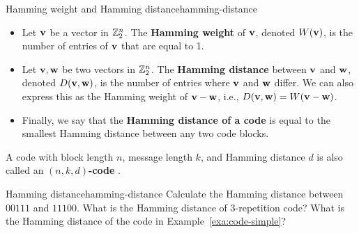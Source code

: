 \begin{definition}{Hamming weight and Hamming distance}{hamming-distance}
  \begin{itemize}
  \item Let $\mbox{\bf v}$ be a vector in $\mathbb{Z}_2^n$. The \textbf{Hamming
      weight}%
     of\/ $\mbox{\bf v}$,
    denoted $W(\mbox{\bf v})$, is the number of entries of\/ $\mbox{\bf v}$
    that are equal to 1.
  \item Let $\mbox{\bf v},\mbox{\bf w}$ be two vectors in $\mathbb{Z}_2^n$. The
    \textbf{Hamming distance}%
     between $\mbox{\bf v}$
    and $\mbox{\bf w}$, denoted $D(\mbox{\bf v},\mbox{\bf w})$, is the number of
    entries where $\mbox{\bf v}$ and $\mbox{\bf w}$ differ. We can also
    express this as the Hamming weight of\/ $\mbox{\bf v}-\mbox{\bf w}$, i.e.,
    $D(\mbox{\bf v},\mbox{\bf w})=W(\mbox{\bf v}-\mbox{\bf w})$.
  \item Finally, we say that the \textbf{Hamming distance of a code}
    is equal to the smallest Hamming distance between any two code
    blocks.
  \end{itemize}
  A code with block length $n$, message length $k$, and Hamming
  distance $d$ is also called an \textbf{$(n,k,d)$-code}%
  .
\end{definition}

\begin{example}{Hamming distance}{hamming-distance}
  Calculate the Hamming distance between $00111$ and $11100$. What is
  the Hamming distance of 3-repetition code? What is the
  Hamming distance of the code in Example~\ref{exa:code-simple}?
\end{example}

